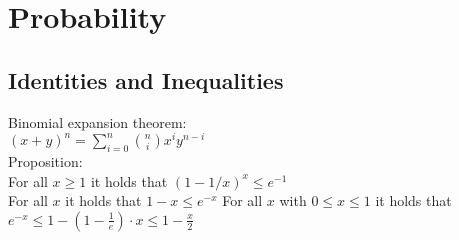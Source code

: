 \section{Probability}
\subsection*{Identities and Inequalities}
Binomial expansion theorem:\\
$(x+y)^n=\sum_{i=0}^{n}\binom{n}{i}x^i y^{n-i}$\\
Proposition:\\
For all $x\ge 1$ it holds that $(1-1/x)^x\le e^{-1}$\\
For all $x$ it holds that $1-x\le e^{-x}$
For all $x$ with $0\le x \le 1$ it holds that\\
$e^{-x}\le 1-(1-\frac{1}{e})\cdot x\le 1-\frac{x}{2}$\\
